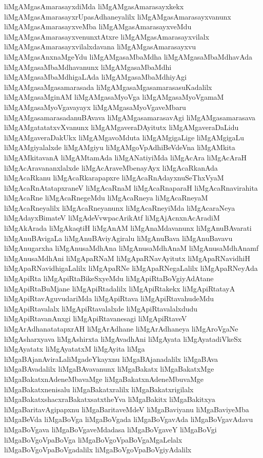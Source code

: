 {liMgAMgasAmarasayxdiMda
liMgAMgasAmarasayxkekx
liMgAMgasAmarasayxrUpasAdhaneyalilx
liMgAMgasAmarasayxvanunx
liMgAMgasAmarasayxveMba
liMgAMgasAmarasayxveMdu
liMgAMgasAmarasayxvenunxtAtxre
liMgAMgasAmarasayxvilalx
liMgAMgasAmarasayxvilalxdavana
liMgAMgasAmarasayxvu
liMgAMgasAnxnaMgeYdu
liMgAMgasaMbaMdha
liMgAMgasaMbaMdhavAda
liMgAMgasaMbaMdhavanunx
liMgAMgasaMbaMdhi
liMgAMgasaMbaMdhigaLAda
liMgAMgasaMbaMdhiyAgi
liMgAMgasaMgasamarasada
liMgAMgasaMgasamarasasuKadalilx
liMgAMgasaMginAM
liMgAMgasaMyoVga
liMgAMgasaMyoVgamaM
liMgAMgasaMyoVgavayayx
liMgAMgasaMyoVgaveMbaru
liMgAMgasamarasadanuBAvava
liMgAMgasamarasavAgi
liMgAMgasamarasava
liMgAMgatatatxvXvanunx
liMgAMgaveraDAyitutx
liMgAMgaveraDaLidu
liMgAMgaveraDakUkx
liMgAMgavoMduta
liMgAMgigaLige
liMgAMgigaLu
liMgAMgiyalalxde
liMgAMgiyu
liMgAMgoVpAdhiBeVdeVna
liMgAMkita
liMgAMkitavanA
liMgAMtamAda
liMgANatiyiMda
liMgAcAra
liMgAcAraH
liMgAcAravananxlalxde
liMgAcAraveMbenayAyx
liMgAcaRkanAda
liMgAcaRkanu
liMgAcaRkarapapxre
liMgAcaRnAdayxnuSeThxVyaM
liMgAcaRnAtatapxraneV
liMgAcaRnaM
liMgAcaRnaparaH
liMgAcaRnavirahita
liMgAcaRne
liMgAcaRnegeMdu
liMgAcaRneya
liMgAcaRneyaM
liMgAcaRneyalilx
liMgAcaRneyanunx
liMgAcaRneyiMda
liMgAcaraNeya
liMgAdayxBimateV
liMgAdeVvwpacArikAtf
liMgAjAcnxnAcAradiM
liMgAkArada
liMgAkaqtiH
liMgAnAM
liMgAnaMdavanunx
liMgAnuBAvarati
liMgAnuBAvigaLa
liMgAnuBAviyAgiralu
liMgAnuBava
liMgAnuBavavu
liMgAnugarxha
liMgAnusaMdhAna
liMgAnusaMdhAnaM
liMgAnusaMdhAnamf
liMgAnusaMdhAni
liMgApaRNaM
liMgApaRNavAyitutx
liMgApaRNavidhiH
liMgApaRNavidhigaLalilx
liMgApaRNe
liMgApaRNegaLalilx
liMgApaRNeyAda
liMgApiRta
liMgApiRtaBikeSxyeMdu
liMgApiRtaBoVgiyAdAtane
liMgApiRtaBuMjane
liMgApiRtadalilx
liMgApiRtakekx
liMgApiRtatayA
liMgApiRtavAguvudariMda
liMgApiRtava
liMgApiRtavahudeMdu
liMgApiRtavalalx
liMgApiRtavalalxde
liMgApiRtavalalxdudu
liMgApiRtavanAnxgi
liMgApiRtavanesagi
liMgApiRtaveV
liMgArAdhanatatapxrAH
liMgArAdhane
liMgArAdhaneya
liMgAroVgaNe
liMgAsharxyava
liMgAshirxta
liMgAvadhAni
liMgAyata
liMgAyatadiVkeSx
liMgAyatatx
liMgAyatatxM
liMgAyita
liMga
liMgaBAjanAviraLaliMgadeYkayxnu
liMgaBAjanadalilx
liMgaBAva
liMgaBAvadalilx
liMgaBAvavanunx
liMgaBakatx
liMgaBakatxMge
liMgaBakatxnAdeneMbavaMge
liMgaBakatxnAdeneMbuvaMge
liMgaBakatxnenisalu
liMgaBakatxralilx
liMgaBakatxrigilalx
liMgaBakatxshacxraBakatxsatxtheYva
liMgaBakitx
liMgaBakitxya
liMgaBaritavAgipapxnu
liMgaBaritaveMdeV
liMgaBaviyanu
liMgaBaviyeMba
liMgaBeVda
liMgaBoVga
liMgaBoVgada
liMgaBoVgavAda
liMgaBoVgavAdavu
liMgaBoVgava
liMgaBoVgaveMdadasa
liMgaBoVgaveY
liMgaBoVgi
liMgaBoVgoVpaBoVga
liMgaBoVgoVpaBoVgaMgaLelalx
liMgaBoVgoVpaBoVgadalilx
liMgaBoVgoVpaBoVgiyAdalilx
}
